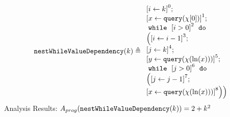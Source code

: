                     \begin{example}
                        \[
                        \kw{nestWhileValueDependency}(k) \triangleq 
                        \begin{array}{l}
                            \clabel{ \assign{i}{k} }^{0} ; \\
                            \clabel{\assign{x}{\query(\chi[0])}}^{1} ; \\
                                \ewhile ~ \clabel{i > 0}^{2} ~ \edo ~ \\
                                \Big(
                                 \clabel{\assign{i}{i-1}}^{3} ;\\
                                 \clabel{\assign{j}{k}}^{4} ;\\
                                 \clabel{\assign{y}{\query(\chi(\ln(x)))} }^{5}  ; \\
                                 \ewhile ~ \clabel{j > 0}^{6} ~ \edo ~ \\
                                 \Big(
                                  \clabel{\assign{j}{j-1}}^{7};\\
                                  \clabel{\assign{x}{\query(\chi(\ln(x)))} }^{8}
                                  \Big) \Big)
                            \end{array}
                        \]
                        Analysis Results: $ A_{{prog}}(\mathtt{nestWhileValueDependency}(k)) = 2 + k^2 $
                    \end{example}
    
